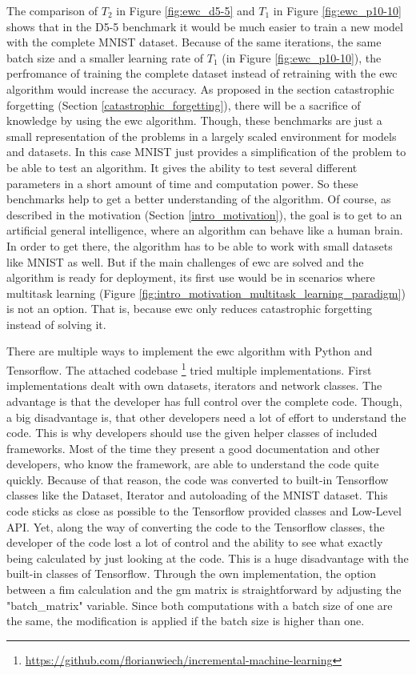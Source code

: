 The comparison of $T_2$ in Figure \ref{fig:ewc_d5-5} and $T_1$ in Figure \ref{fig:ewc_p10-10} shows that in the D5-5 benchmark it would be much easier to train a new model with the complete MNIST dataset.
Because of the same iterations, the same batch size and a smaller learning rate of $T_1$ (in Figure \ref{fig:ewc_p10-10}), the perfromance of training the complete dataset instead of retraining with the \acrshort{ewc} algorithm would increase the accuracy.
As proposed in the section catastrophic forgetting (Section \ref{catastrophic_forgetting}), there will be a sacrifice of knowledge by using the \acrshort{ewc} algorithm.
Though, these benchmarks are just a small representation of the problems in a largely scaled environment for models and datasets.
In this case MNIST just provides a simplification of the problem to be able to test an algorithm.
It gives the ability to test several different parameters in a short amount of time and computation power.
So these benchmarks help to get a better understanding of the algorithm.
\newline
Of course, as described in the motivation (Section \ref{intro_motivation}), the goal is to get to an artificial general intelligence, where an algorithm can behave like a human brain.
In order to get there, the algorithm has to be able to work with small datasets like MNIST as well.
But if the main challenges of \acrshort{ewc} are solved and the algorithm is ready for deployment, its first use would be in scenarios where multitask learning (Figure \ref{fig:intro_motivation_multitask_learning_paradigm}) is not an option.
That is, because \acrshort{ewc} only reduces catastrophic forgetting instead of solving it.

There are multiple ways to implement the \acrshort{ewc} algorithm with Python and Tensorflow.
The attached codebase \footnote{\url{https://github.com/florianwiech/incremental-machine-learning}} tried multiple implementations.
First implementations dealt with own datasets, iterators and network classes.
The advantage is that the developer has full control over the complete code.
Though, a big disadvantage is, that other developers need a lot of effort to understand the code.
This is why developers should use the given helper classes of included frameworks.
Most of the time they present a good documentation and other developers, who know the framework, are able to understand the code quite quickly.
Because of that reason, the code was converted to built-in Tensorflow classes like the Dataset, Iterator and autoloading of the MNIST dataset.
This code sticks as close as possible to the Tensorflow provided classes and Low-Level API.
Yet, along the way of converting the code to the Tensorflow classes, the developer of the code lost a lot of control and the ability to see what exactly being calculated by just looking at the code.
This is a huge disadvantage with the built-in classes of Tensorflow.
\newline
Through the own implementation, the option between a \acrshort{fim} calculation and the \acrshort{gm} matrix is straightforward by adjusting the "batch\_matrix" variable.
Since both computations with a batch size of one are the same, the modification is applied if the batch size is higher than one.

